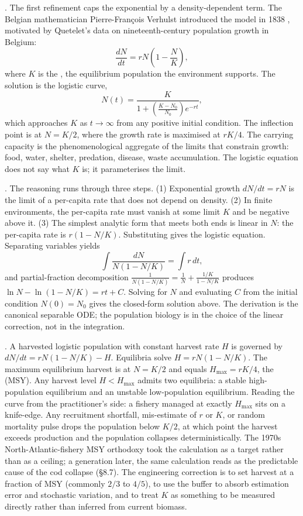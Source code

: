 . The first refinement caps the
exponential by a density-dependent term. The Belgian mathematician
Pierre-Fran\c{c}ois Verhulst introduced the model in 1838
\cite[pp.~117--121]{hist:v6c08-verhulst-1838}, motivated by Quetelet's data on
nineteenth-century population growth in Belgium:
\[
\frac{dN}{dt} = r N \left(1 - \frac{N}{K}\right),
\]
where $K$ is the , the equilibrium
population the environment supports. The solution is the logistic
curve,
\[
N(t) = \frac{K}{1 + \left(\frac{K - N_0}{N_0}\right) e^{-r t}},
\]
which approaches $K$ as $t \to \infty$ from any positive initial
condition. The inflection point is at $N = K/2$, where the growth
rate is maximised at $r K/4$. The carrying capacity is the
phenomenological aggregate of the limits that constrain growth:
food, water, shelter, predation, disease, waste accumulation. The
logistic equation does not say what $K$ is; it parameterises the
limit.

. The reasoning runs
through three steps. (1) Exponential growth $dN/dt = rN$ is the
limit of a per-capita rate that does not depend on density. (2) In
finite environments, the per-capita rate must vanish at some
limit $K$ and be negative above it. (3) The simplest analytic form
that meets both ends is linear in $N$: the per-capita rate is
$r(1 - N/K)$. Substituting gives the logistic equation. Separating
variables yields
\[
\int \frac{dN}{N(1 - N/K)} = \int r\,dt,
\]
and partial-fraction decomposition $\frac{1}{N(1 - N/K)} =
\frac{1}{N} + \frac{1/K}{1 - N/K}$ produces $\ln N - \ln(1 - N/K) =
rt + C$. Solving for $N$ and evaluating $C$ from the initial
condition $N(0) = N_0$ gives the closed-form solution above. The
derivation is the canonical separable ODE; the population biology is
in the choice of the linear correction, not in the integration.

. A
harvested logistic population with constant harvest rate $H$ is
governed by $dN/dt = rN(1 - N/K) - H$. Equilibria solve
$H = rN(1 - N/K)$. The maximum equilibrium harvest is at $N = K/2$
and equals $H_{\max} = rK/4$, the  (MSY). Any harvest level $H < H_{\max}$ admits two equilibria:
a stable high-population equilibrium and an unstable low-population
equilibrium. Reading the curve from the practitioner's side: a
fishery managed at exactly $H_{\max}$ sits on a knife-edge. Any
recruitment shortfall, mis-estimate of $r$ or $K$, or random
mortality pulse drops the population below $K/2$, at which point the
harvest exceeds production and the population collapses
deterministically. The 1970s North-Atlantic-fishery MSY orthodoxy
took the calculation as a target rather than as a ceiling; a
generation later, the same calculation reads as the predictable cause
of the cod collapse (§8.7). The engineering correction is to set
harvest at a fraction of MSY (commonly $2/3$ to $4/5$), to use the
buffer to absorb estimation error and stochastic variation, and to
treat $K$ as something to be measured directly rather than inferred
from current biomass.

